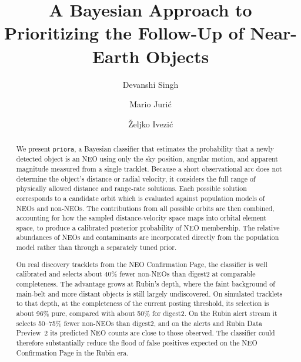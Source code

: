 \documentclass[linenumbers,twocolumn]{aastex701}
\newcommand{\priora}{{\tt priora}\xspace} %
\begin{document}
\title{A Bayesian Approach to Prioritizing the Follow-Up of Near-Earth Objects}




\author[0009-0004-0059-3229]{Devanshi Singh}

\author[orcid=0000-0003-1996-9252]{Mario Juri\'{c}}


\author[orcid=0000-0001-5250-2633]{\v{Z}eljko Ivezi\'{c}}



%


\begin{abstract}

We present \priora, a Bayesian classifier that estimates the probability that a newly detected object is an NEO using only the sky position, angular motion, and apparent magnitude measured from a single tracklet. Because a short observational arc does not determine the object’s distance or radial velocity, it considers the full range of physically allowed distance and range-rate solutions. Each possible solution corresponds to a candidate orbit which is evaluated against population models of NEOs and non-NEOs. The contributions from all possible orbits are then combined, accounting for how the sampled distance-velocity space maps into orbital element space, to produce a calibrated posterior probability of NEO membership. The relative abundances of NEOs and contaminants are incorporated directly from the population model rather than through a separately tuned prior.

On real discovery tracklets from the NEO Confirmation Page, the classifier is well calibrated and selects about 40\% fewer non-NEOs than digest2 at comparable completeness. The advantage grows at Rubin's depth, where the faint background of main-belt and more distant objects is still largely undiscovered. On simulated tracklets to that depth, at the completeness of the current posting threshold, its selection is about 96\% pure, compared with about 50\% for digest2. On the Rubin alert stream it selects 50--75\% fewer non-NEOs than digest2, and on the alerts and Rubin Data Preview~2 its predicted NEO counts are close to those observed. The classifier could therefore substantially reduce the flood of false positives expected on the NEO Confirmation Page in the Rubin era.


\end{abstract}
\end{document}
